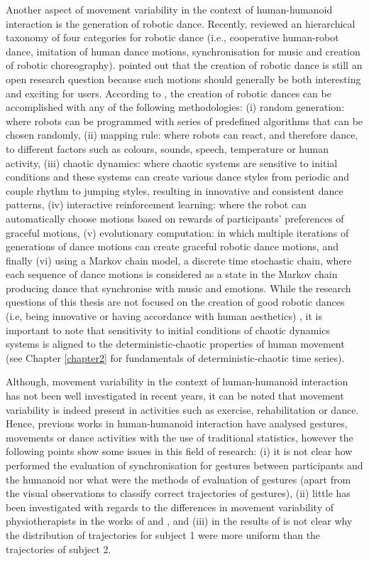 Another aspect of movement variability in the context of human-humanoid 
interaction is the generation of robotic dance.
Recently, \cite{peng2015} reviewed an hierarchical taxonomy of 
four categories for robotic dance (i.e., cooperative human-robot dance, 
imitation of human dance motions, synchronisation for music and 
creation of robotic choreography).
\cite{peng2015} pointed out that the creation of robotic dance is still 
an open research question because such motions should generally be both 
interesting and exciting for users. 
According to \cite{peng2015}, the creation of robotic dances can be 
accomplished with any of the following methodologies:
(i) random generation: where robots can be 
programmed with series of predefined algorithms that can be chosen randomly,
(ii) mapping rule:  where robots can react, and therefore dance, to different 
factors such as colours, sounds, speech, temperature or human activity,
(iii) chaotic dynamics: where chaotic systems are sensitive 
to initial conditions and these systems can create various 
dance styles from periodic and couple rhythm to jumping styles,
resulting in innovative and consistent dance patterns,
(iv) interactive reinforcement learning: where the robot can automatically 
choose motions based on rewards of participants' 
preferences of graceful motions,
(v) evolutionary computation: in which multiple iterations of generations
of dance motions can create graceful robotic dance motions, and
finally (vi) using a Markov chain model, a discrete time stochastic chain, 
where each sequence of dance motions is considered as a state in the Markov 
chain producing dance that synchronise with music and emotions.
While the research questions of this thesis are not focused on 
the creation of good robotic dances (i.e, being innovative or having 
accordance with human aesthetics) \citep{peng2015}, 
it is important to note that sensitivity to initial conditions 
of chaotic dynamics systems is aligned to
the deterministic-chaotic properties of human movement
(see Chapter \ref{chapter2} for fundamentals of 
deterministic-chaotic time series).

Although, movement variability in the context of human-humanoid interaction
has not been well investigated in recent years, it can be noted 
that movement variability is indeed present in activities such as 
exercise, rehabilitation or dance. 
Hence, previous works in human-humanoid interaction have analysed gestures, 
movements or dance activities with the use of traditional statistics, 
however the following points show some issues in this field of research: 
(i) it is not clear how \cite{gorer2013} performed the evaluation of 
synchronisation for gestures between participants and the humanoid
nor what were the methods of evaluation of gestures
(apart from the visual observations to classify correct 
trajectories of gestures),  
(ii) little has been investigated with regards to the 
differences in movement variability of physiotherapists in the works of
\cite{guneysu2014} and  \cite{guneysu2015}, and 
(iii) in the results of \cite{tsuchida2013}
is not clear why the distribution of trajectories for subject 1 
were more uniform than the trajectories of subject 2.

